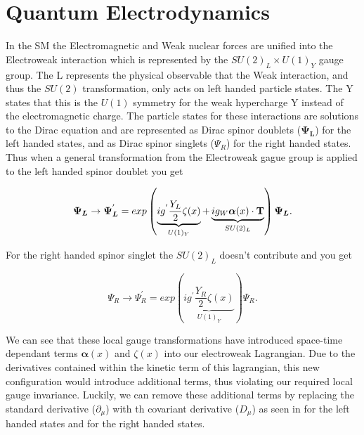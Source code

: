 \section{Quantum Electrodynamics} \label{sec:theory:qed}

In the SM the Electromagnetic and Weak nuclear forces are unified into the
Electroweak interaction which is represented by the $SU(2)_L \times U(1)_Y$
gauge group. The L represents the physical observable that the Weak interaction,
and thus the $SU(2)$ transformation, only acts on left handed particle states.
The Y states that this is the $U(1)$ symmetry for the weak hypercharge Y instead
of the electromagnetic charge.  The particle states for these interactions are
solutions to the Dirac equation and are represented as Dirac spinor doublets
($\boldsymbol{\Psi_L}$) for the left handed states, and as Dirac spinor singlets
($\Psi_R$) for the right handed states.  Thus when a general transformation from
the Electroweak gague group is applied to the left handed spinor doublet you get

\begin{equation} \label{eq:qed:doublet} 
\boldsymbol{\Psi_L} \rightarrow \boldsymbol{\Psi_L}^{'} = exp \left(
\underbrace{ ig^{'} \frac{Y_L}{2}
\zeta (x) }_{U(1)_Y} + \underbrace{ ig_{W} \boldsymbol{\alpha}(x) \cdot
\text{\bf{T}} }_{SU(2)_L} \right) \boldsymbol{\Psi_L}.
\end{equation}

For the right handed spinor singlet the $SU(2)_L$ doesn't contribute and
you get 

\begin{equation} \label{eq:qed:singlet} 
{\Psi_R} \rightarrow \Psi_R^{'} = exp \left( \underbrace{ ig^{'} \frac{Y_R}{2}
\zeta (x) }_{U(1)_Y} \right) \Psi_R.
\end{equation}

We can see that these local gauge transformations have introduced space-time
dependant terms $\boldsymbol{\alpha}(x)$ and $\zeta(x)$ into our electroweak
Lagrangian.  Due to the derivatives contained within the kinetic term of this
lagrangian, this new configuration would introduce additional terms, thus
violating our required local gauge invariance.  Luckily, we can remove these
additional terms by replacing the standard derivative ($\partial_{\mu}$) with th
covariant derivative ($D_{\mu}$) as seen in  for the
left handed states and  for the right handed states.

